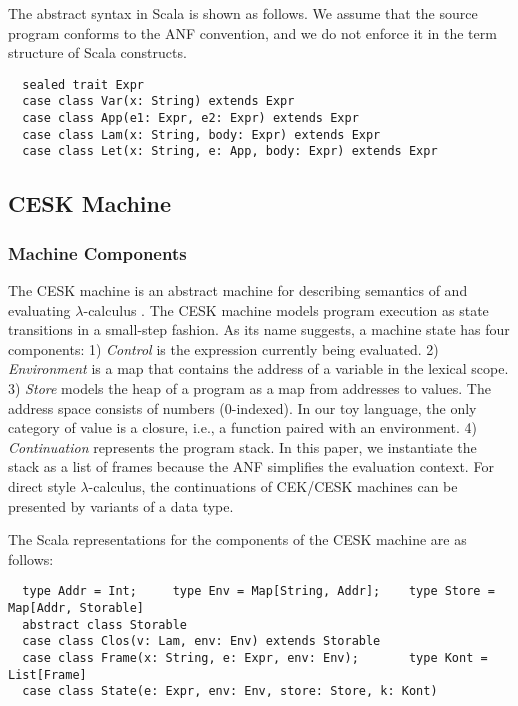 \documentclass[acmsmall, review]{acmart}\settopmatter{}
\begin{document}
The abstract syntax in Scala is shown as follows. We assume that the source program conforms
to the ANF convention, and we do not enforce it in the term structure of Scala constructs.

\begin{lstlisting}
  sealed trait Expr
  case class Var(x: String) extends Expr
  case class App(e1: Expr, e2: Expr) extends Expr
  case class Lam(x: String, body: Expr) extends Expr
  case class Let(x: String, e: App, body: Expr) extends Expr
\end{lstlisting}

\subsection{CESK Machine} \label{cesk}

\subsubsection{Machine Components}

The CESK machine is an abstract machine for describing semantics of and evaluating 
$\lambda$-calculus \cite{felleisen1987calculus}. The CESK machine models program execution 
as state transitions in a small-step fashion. As its name suggests, a machine state has 
four components:
1) \textit{Control} is the expression currently being evaluated.
2) \textit{Environment} is a map that contains the address of a variable in the lexical scope.
3) \textit{Store} models the heap of a program as a map from addresses to values.
  The address space consists of numbers (0-indexed).
  In our toy language, the only category of value is a closure, i.e., a function paired with
  an environment.
4) \textit{Continuation} represents the program stack. In this paper, we instantiate the 
  stack as a list of frames because the ANF simplifies the evaluation context. For direct 
  style $\lambda$-calculus, the continuations of CEK/CESK machines can be presented by
  variants of a data type.

The Scala representations for the components of the CESK machine are as follows:

\begin{lstlisting}
  type Addr = Int;     type Env = Map[String, Addr];    type Store = Map[Addr, Storable]
  abstract class Storable
  case class Clos(v: Lam, env: Env) extends Storable
  case class Frame(x: String, e: Expr, env: Env);       type Kont = List[Frame]
  case class State(e: Expr, env: Env, store: Store, k: Kont)
\end{lstlisting}
\end{document}
